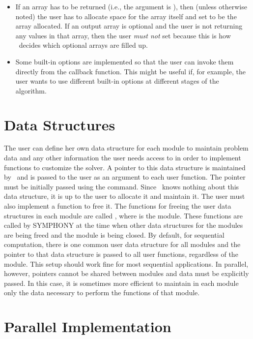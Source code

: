 \begin{description}
\begin{itemize}
\item If an array has to be returned (i.e., the argument is ), then (unless otherwise noted) the user has to allocate space for
  the array itself and set  to be the array allocated. If an
  output array is optional and the user is not returning any values in that
  array, then the user {\em must not} set  because this is how
  \BB\ decides which optional arrays are filled up.

\item Some built-in options are implemented so that the user can invoke them
directly from the callback function. This might be useful if, for example,
the user wants to use different built-in options at different stages
of the algorithm.
\end{itemize}

\end{description}

\section{Data Structures}

The user can define her own data structure for each module to maintain problem
data and any other information the user needs access to in order to implement
functions to customize the solver. A pointer to this data structure is
maintained by \BB\ and is passed to the user as an argument to each user
function. The pointer must be initially passed using the
 command. Since \BB\ knows nothing about this data
structure, it is up to the user to allocate it and maintain it. The user must
also implement a function to free it. The functions for freeing the user data
structures in each module are called , where \code{*} is
the module. These functions are called by SYMPHONY at the time when other data
structures for the modules are being freed and the module is being closed. By
default, for sequential computation, there is one common user data structure
for all modules and the pointer to that data structure is passed to all user
functions, regardless of the module. This setup should work fine for most
sequential applications. In parallel, however, pointers cannot be shared
between modules and data must be explicitly passed. In this case, it is
sometimes more efficient to maintain in each module only the data necessary to
perform the functions of that module.

\section{Parallel Implementation}

